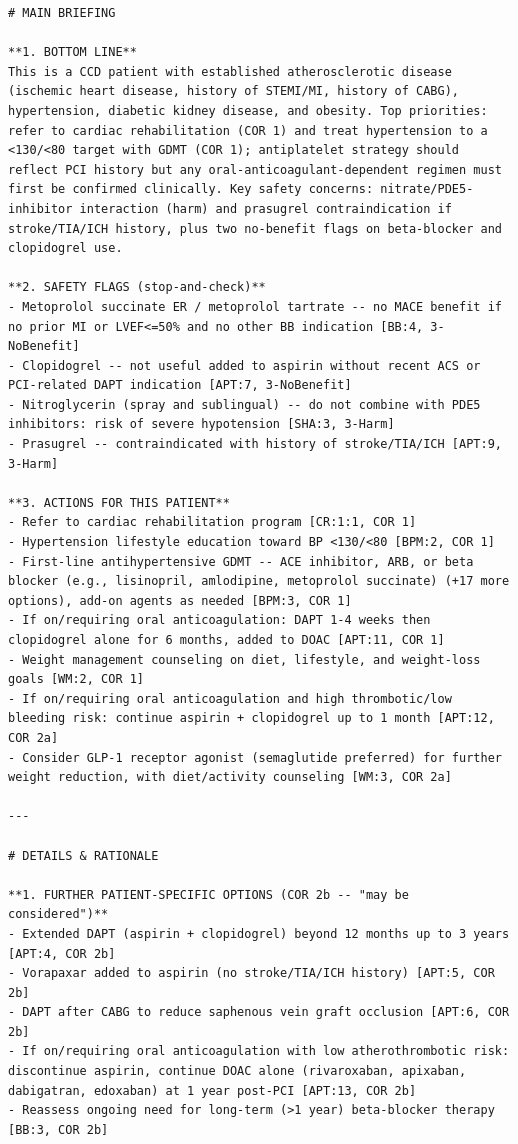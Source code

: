 \begin{lstlisting}[basicstyle=\scriptsize\ttfamily,numbers=none,caption={Complete grounded briefing for one patient, as generated (\texttt{claude-sonnet-5}) and stored under \texttt{eval/}.},label={lst:briefing-example}]
# MAIN BRIEFING

**1. BOTTOM LINE**
This is a CCD patient with established atherosclerotic disease (ischemic heart disease, history of STEMI/MI, history of CABG), hypertension, diabetic kidney disease, and obesity. Top priorities: refer to cardiac rehabilitation (COR 1) and treat hypertension to a <130/<80 target with GDMT (COR 1); antiplatelet strategy should reflect PCI history but any oral-anticoagulant-dependent regimen must first be confirmed clinically. Key safety concerns: nitrate/PDE5-inhibitor interaction (harm) and prasugrel contraindication if stroke/TIA/ICH history, plus two no-benefit flags on beta-blocker and clopidogrel use.

**2. SAFETY FLAGS (stop-and-check)**
- Metoprolol succinate ER / metoprolol tartrate -- no MACE benefit if no prior MI or LVEF<=50% and no other BB indication [BB:4, 3-NoBenefit]
- Clopidogrel -- not useful added to aspirin without recent ACS or PCI-related DAPT indication [APT:7, 3-NoBenefit]
- Nitroglycerin (spray and sublingual) -- do not combine with PDE5 inhibitors: risk of severe hypotension [SHA:3, 3-Harm]
- Prasugrel -- contraindicated with history of stroke/TIA/ICH [APT:9, 3-Harm]

**3. ACTIONS FOR THIS PATIENT**
- Refer to cardiac rehabilitation program [CR:1:1, COR 1]
- Hypertension lifestyle education toward BP <130/<80 [BPM:2, COR 1]
- First-line antihypertensive GDMT -- ACE inhibitor, ARB, or beta blocker (e.g., lisinopril, amlodipine, metoprolol succinate) (+17 more options), add-on agents as needed [BPM:3, COR 1]
- If on/requiring oral anticoagulation: DAPT 1-4 weeks then clopidogrel alone for 6 months, added to DOAC [APT:11, COR 1]
- Weight management counseling on diet, lifestyle, and weight-loss goals [WM:2, COR 1]
- If on/requiring oral anticoagulation and high thrombotic/low bleeding risk: continue aspirin + clopidogrel up to 1 month [APT:12, COR 2a]
- Consider GLP-1 receptor agonist (semaglutide preferred) for further weight reduction, with diet/activity counseling [WM:3, COR 2a]

---

# DETAILS & RATIONALE

**1. FURTHER PATIENT-SPECIFIC OPTIONS (COR 2b -- "may be considered")**
- Extended DAPT (aspirin + clopidogrel) beyond 12 months up to 3 years [APT:4, COR 2b]
- Vorapaxar added to aspirin (no stroke/TIA/ICH history) [APT:5, COR 2b]
- DAPT after CABG to reduce saphenous vein graft occlusion [APT:6, COR 2b]
- If on/requiring oral anticoagulation with low atherothrombotic risk: discontinue aspirin, continue DOAC alone (rivaroxaban, apixaban, dabigatran, edoxaban) at 1 year post-PCI [APT:13, COR 2b]
- Reassess ongoing need for long-term (>1 year) beta-blocker therapy [BB:3, COR 2b]


\end{lstlisting}
